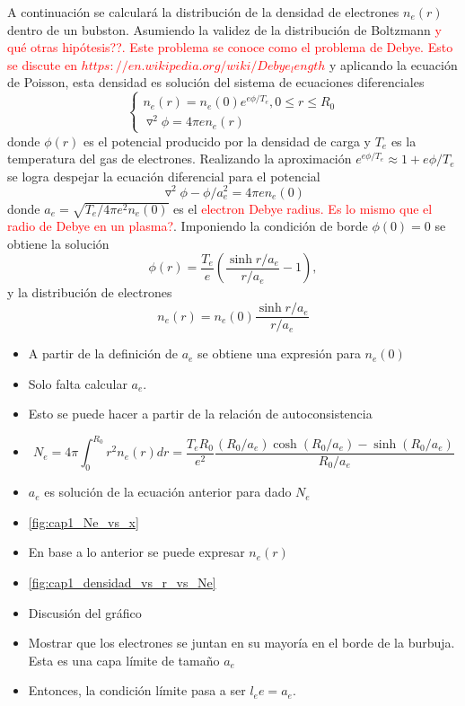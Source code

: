 \documentclass[aps,prb,twocolumn,superscriptaddress,floatfix,longbibliography,10pt]{revtex4-2}
\newif\ifptitle
\newif\ifpnumber
\newcounter{para}
\newcommand\ptitle[1]{\par\refstepcounter{para}
{\ifpnumber{\noindent\textcolor{lightgray}{\textbf{\thepara}}\indent}\fi}
{\ifptitle{\textbf{[{#1}]}}\fi}}
\begin{document}
A continuación se calculará la distribución de la densidad de electrones $n_e(r)$ dentro de un bubston. Asumiendo la validez de la distribución de Boltzmann \textcolor{red}{y qué otras hipótesis??. Este problema se conoce como el problema de Debye. Esto se discute en $https://en.wikipedia.org/wiki/Debye_length$} y aplicando la ecuación de Poisson, esta densidad es solución del sistema de ecuaciones diferenciales
\[
\left\{\begin{matrix}
  n_e(r) = n_e(0)e^{e \phi / T_e}, 0 \leq r \leq R_0 \\
  \triangledown^2 \phi = 4 \pi e n_e(r)
\end{matrix}\right.
\]
donde $\phi(r)$ es el potencial producido por la densidad de carga y $T_e$ es la temperatura del gas de electrones. Realizando la aproximación $e^{e \phi / T_e} \approx 1 + e \phi/T_e$
se logra despejar la ecuación diferencial para el potencial
\[\triangledown^2 \phi - \phi/a_e^2 = 4 \pi e n_e(0) \]
donde $a_e = \sqrt{T_e/4\pi e^2 n_e(0)}$ es el \textcolor{red}{electron Debye radius. Es lo mismo que el radio de Debye en un plasma?}. Imponiendo la condición de borde $\phi(0) = 0$ se obtiene la solución
\begin{equation}
  \phi(r) = \frac{T_e}{e} \left ( \frac{\sinh{r/a_e}}{r/a_e} - 1   \right ),
  \label{eq:cap1_phi}
\end{equation}
y la distribución de electrones
\begin{equation}
  n_e(r) = n_e(0) \frac{\sinh{r/a_e}}{r/a_e}
  \label{eq:cap1_ne}
\end{equation}


\ptitle{Cálculo de las ctes de la expresión de la densidad máxima}

\begin{itemize}
  \item A partir de la definición de $a_e$ se obtiene una expresión para $n_e(0)$
  \item Solo falta calcular $a_e$.
  \item Esto se puede hacer a partir de la relación de autoconsistencia
  \item \begin{equation}
          N_e = 4 \pi \int_0^{R_0} r^2 n_e(r) dr = \frac{T_e R_0}{e^2} \frac{(R_0/a_e) \cosh{(R_0/a_e)} - \sinh{(R_0/a_e)}}{R_0/a_e}
          \label{eq:cap1_Ne}
        \end{equation}
  \item $a_e$ es solución de la ecuación anterior para dado $N_e$
  \item \ref{fig:cap1_Ne_vs_x}
  \item En base a lo anterior se puede expresar $n_e(r)$
  \item \ref{fig:cap1_densidad_vs_r_vs_Ne}
  \item Discusión del gráfico
  \item Mostrar que los electrones se juntan en su mayoría en el borde de la burbuja. Esta es una capa límite de tamaño $a_e$
  \item Entonces, la condición límite pasa a ser $l_ee = a_e$.
\end{itemize}
\end{document}
